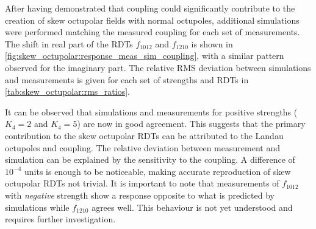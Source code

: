 After having demonstrated that coupling could significantly contribute to the creation of skew
octupolar fields with normal octupoles, additional simulations were performed matching the measured
coupling for each set of measurements. The shift in real part of the RDTs $f_{1012}$ and $f_{1210}$
is shown in \cref{fig:skew_octupolar:response_meas_sim_coupling}, with a similar pattern observed
for the imaginary part. The relative RMS deviation between simulations and measurements is given
for each set of strengths and RDTs in \cref{tab:skew_octupolar:rms_ratios}.

It can be observed that simulations and measurements for positive strengths ($K_4=2$ and $K_4=5$) 
are now in good agreement. This suggests that the primary contribution to the skew octupolar RDTs
can be attributed to the Landau octupoles and coupling. The relative deviation between measurement
and simulation can be explained by the sensitivity to the coupling. A difference of $10^{-4}$ units 
is enough to be noticeable, making accurate reproduction of skew octupolar RDTs not trivial.
It is important to note that measurements of $f_{1012}$ with \textit{negative} strength show a
response opposite to what is predicted by simulations while $f_{1210}$ agrees well. This behaviour
is not yet understood and requires further investigation.

